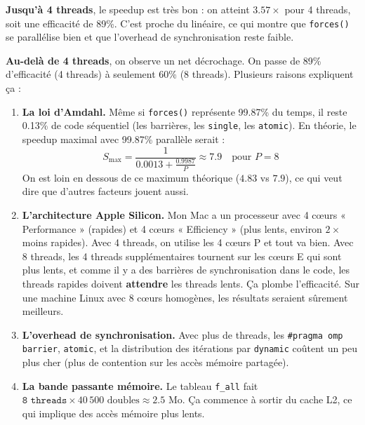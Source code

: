 \documentclass[12pt,a4paper]{article}
\begin{document}
\textbf{\textcolor{resultborder}{Jusqu'à 4 threads}}, le speedup est très bon : on atteint $3.57\times$ pour 4 threads, soit une efficacité de 89\%. C'est proche du linéaire, ce qui montre que \texttt{forces()} se parallélise bien et que l'overhead de synchronisation reste faible.

\textbf{\textcolor{warnborder}{Au-delà de 4 threads}}, on observe un net décrochage. On passe de 89\% d'efficacité (4 threads) à seulement 60\% (8 threads). Plusieurs raisons expliquent ça :

\begin{enumerate}[leftmargin=2em]
  \item \textbf{\textcolor{mainblue}{La loi d'Amdahl.}} Même si \texttt{forces()} représente 99.87\% du temps, il reste 0.13\% de code séquentiel (les barrières, les \texttt{single}, les \texttt{atomic}). En théorie, le speedup maximal avec 99.87\% parallèle serait :
  $$
  S_{\max} = \frac{1}{0.0013 + \frac{0.9987}{P}} \approx 7.9 \quad \text{pour } P = 8
  $$
  On est loin en dessous de ce maximum théorique ($4.83$ vs $7.9$), ce qui veut dire que d'autres facteurs jouent aussi.

  \item \textbf{\textcolor{mainblue}{L'architecture Apple Silicon.}} Mon Mac a un processeur avec 4 cœurs « Performance » (rapides) et 4 cœurs « Efficiency » (plus lents, environ $2\times$ moins rapides). Avec 4 threads, on utilise les 4 cœurs P et tout va bien. Avec 8 threads, les 4 threads supplémentaires tournent sur les cœurs E qui sont plus lents, et comme il y a des barrières de synchronisation dans le code, les threads rapides doivent \textbf{attendre} les threads lents. Ça plombe l'efficacité. Sur une machine Linux avec 8 cœurs homogènes, les résultats seraient sûrement meilleurs.

  \item \textbf{\textcolor{mainblue}{L'overhead de synchronisation.}} Avec plus de threads, les \texttt{\#pragma omp barrier}, \texttt{atomic}, et la distribution des itérations par \texttt{dynamic} coûtent un peu plus cher (plus de contention sur les accès mémoire partagée).

  \item \textbf{\textcolor{mainblue}{La bande passante mémoire.}} Le tableau \texttt{f\_all} fait $\texttt{8 threads} \times 40\,500 \text{ doubles} \approx 2.5$ Mo. Ça commence à sortir du cache L2, ce qui implique des accès mémoire plus lents.
\end{enumerate}
\end{document}

